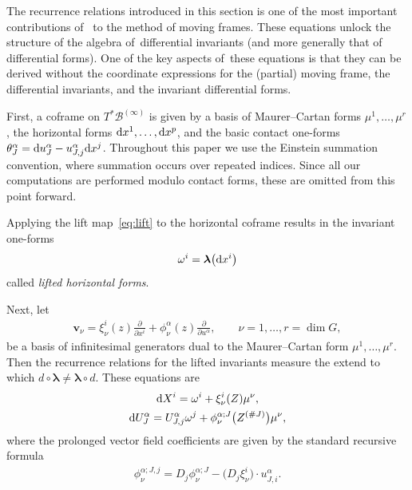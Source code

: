 \documentclass[10pt,a4paper]{amsart}
\numberwithin{equation}{section}
\newcommand{\B}{\mathcal{B}}
\newcommand{\bl}{\boldsymbol{\lambda}}
\newcommand{\pp}[2]{\frac{\partial #1}{\partial #2}}
\newcommand{\vv}{\mathbf{v}}
\begin{document}
The recurrence relations introduced in this section is one of the most important contributions of~\cite{FO-1999} to the method of moving frames. These equations unlock the structure of the algebra of~differential invariants (and more generally that of differential forms). One of the key aspects of~these equations is that they can be derived without the coordinate expressions for the (partial) moving frame, the differential invariants, and the invariant differential forms.

First, a coframe on $T^*\B^{(\infty)}$ is given by a basis of Maurer--Cartan forms $\mu^1,\dots,\mu^r$, the horizontal forms ${\rm d}x^1,\dots,{\rm d}x^p$, and the basic contact one-forms $\theta^\alpha_J = {\rm d}u^\alpha_J - u^\alpha_{J,j}{\rm d}x^j$. Throughout this paper we use the Einstein summation convention, where summation
occurs over repeated indices. Since all our computations are performed modulo contact forms, these are omitted from this point forward.

Applying the lift map~\eqref{eq:lift} to the horizontal coframe results in the invariant one-forms
\begin{gather*}
\omega^i = \bl\big({\rm d}x^i\big)
\end{gather*}
called \emph{lifted horizontal forms}.

Next, let
\begin{gather*}
\vv_\nu = \xi^i_\nu(z) \pp{}{x^i} + \phi^\alpha_\nu(z) \pp{}{u^\alpha},\qquad
\nu=1,\dots,r=\dim G,
\end{gather*}
be a basis of infinitesimal generators dual to the Maurer--Cartan form $\mu^1,\dots,\mu^r$. Then the recurrence relations for the lifted invariants measure the extend to which $d\circ \bl \neq \bl \circ d$. These equations are
%
\begin{gather}
{\rm d}X^i = \omega^i + \xi^i_\nu(Z) \mu^\nu,\nonumber
\\
{\rm d}U^\alpha_{J} = U_{J,j}^\alpha \omega^j + \phi^{\alpha;J}_\nu\big(Z^{(\#J)}\big) \mu^\nu,
\label{eq:lifted recurrence relations}
\end{gather}
%
where the prolonged vector field coefficients are given by the standard recursive formula
\begin{gather*}
\phi^{\alpha;J,j}_\nu = D_j \phi^{\alpha;J}_\nu - \big(D_j\xi^i_\nu\big)\cdot u^\alpha_{J,i}.
\end{gather*}
\end{document}
